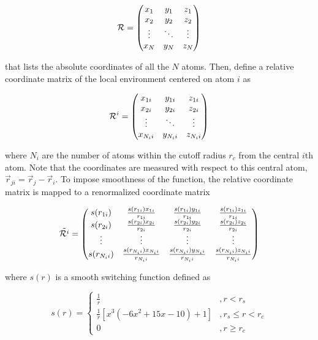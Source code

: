 \begin{equation}
    \mathcal{R} =  \mqty( x_1 & y_1 & z_1 \\ x_2 & y_2 & z_2 \\ \vdots & \ddots
    &
    \vdots \\
    x_N & y_N & z_N)
\end{equation}

that lists the absolute coordinates of all the $N$ atoms. Then, define a
relative
coordinate matrix of the local environment centered on atom  $i$ as

\begin{equation}
    \mathcal{R}^i =  \mqty( x_{1i} & y_{1i} & z_{1i} \\ x_{2i} & y_{2i} &
    z_{2i}
    \\ \vdots & \ddots
    &
    \vdots \\
    x_{N_i i} & y_{N_i i} & z_{N_i i})
\end{equation}

where $N_i$ are the number of atoms within the cutoff radius $r_c$ from the
central $i$th atom. Note that the coordinates are measured with respect to this
central atom, $\vec{r}_{ji} = \vec{r}_{j}- \vec{r}_{i}$. To impose smoothness
of the function, the relative coordinate matrix is mapped to  a renormalized
coordinate matrix

\begin{equation}
    \tilde{\mathcal{R}^i} =  \mqty( s(r_{1i}) &
    \frac{s(r_{1i}) x_{1i}}{r_{1i}}
    &	 \frac{s(r_{1i}) y_{1i}}{r_{1i}} &
    \frac{s(r_{1i}) z_{1i}}{r_{1i}} \\
    s(r_{2i}) &
    \frac{s(r_{2i}) x_{2i}}{r_{2i}}
    &	 \frac{s(r_{2i}) y_{2i}}{r_{2i}} &
    \frac{s(r_{2i}) z_{2i}}{r_{2i}}
    \\ \vdots & \vdots & \vdots
    &
    \vdots \\
    s(r_{N_i i}) &
    \frac{s(r_{N_i i}) x_{N_i i}}{r_{N_i i}}
    &	 \frac{s(r_{N_i i}) y_{N_i i}}{r_{N_i i}} &
    \frac{s(r_{N_i i}) z_{N_i i}}{r_{N_i i}} )
\end{equation}

where $s(r)$ is a smooth switching function defined as

\begin{equation}
    s(r) = \begin{cases}
        \frac{1}{r}                                   & , r   < r_s        \\
        \frac{1}{r} \left[x^3 (-6x^2+15x-10)+1\right] & , r_s \leq r < r_c \\
        0                                             & , r   \geq r_c
    \end{cases}
\end{equation}

